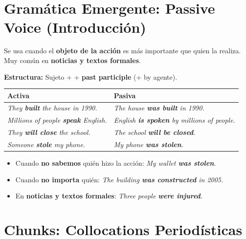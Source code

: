 \documentclass[12pt,a4paper]{article}
\begin{document}
\section{Gramática Emergente: Passive Voice (Introducción)}

\begin{cajagrammar}
Se usa cuando el \textbf{objeto de la acción} es más importante que quien la realiza. Muy común en \textbf{noticias y textos formales}.

\medskip
\textbf{Estructura:} Sujeto +  + \textbf{past participle} (+ by agente).

\medskip
\begin{tabularx}{\textwidth}{@{} l X @{}}
\toprule
\textbf{Activa} & \textbf{Pasiva} \\
\midrule
\textit{They \textbf{built} the house in 1990.} & \textit{The house \textbf{was built} in 1990.} \\
\textit{Millions of people \textbf{speak} English.} & \textit{English \textbf{is spoken} by millions of people.} \\
\textit{They \textbf{will close} the school.} & \textit{The school \textbf{will be closed}.} \\
\textit{Someone \textbf{stole} my phone.} & \textit{My phone \textbf{was stolen}.} \\
\bottomrule
\end{tabularx}

\medskip
\begin{cajaejemplo}
\begin{itemize}[nosep, leftmargin=0.8cm]
  \item Cuando \textbf{no sabemos} quién hizo la acción: \textit{My wallet \textbf{was stolen}.}
  \item Cuando \textbf{no importa} quién: \textit{The building \textbf{was constructed} in 2005.}
  \item En \textbf{noticias y textos formales}: \textit{Three people \textbf{were injured}.}
\end{itemize}
\end{cajaejemplo}
\end{cajagrammar}

\section{Chunks: Collocations Periodísticas}
\end{document}
